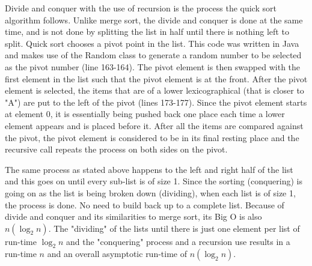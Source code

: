 \documentclass[letterpaper, 10pt,DIV=13]{scrartcl}
\numberwithin{equation}{section} %
\numberwithin{figure}{section} %
\numberwithin{table}{section} %
\begin{document}
Divide and conquer with the use of recursion is the process the quick sort algorithm follows.  Unlike merge sort, the divide and conquer is done at the same time, and is not done by splitting the list in half until there is nothing left to split.  Quick sort chooses a pivot point in the list.  This code was written in Java and makes use of the Random class to generate a random number to be selected as the pivot number (line 163-164).  The pivot element is then swapped with the first element in the list such that the pivot element is at the front.  After the pivot element is selected, the items that are of a lower lexicographical (that is closer to "A") are put to the left of the pivot (lines 173-177).  Since the pivot element starts at element 0, it is essentially being pushed back one place each time a lower element appears and is placed before it.  After all the items are compared against the pivot, the pivot element is considered to be in its final resting place and the recursive call repeats the process on both sides on the pivot.  

The same process as stated above happens to the left and right half of the list and this goes on until every sub-list is of size 1.  Since the sorting (conquering) is going on as the list is being broken down (dividing), when each list is of size 1, the process is done.  No need to build back up to a complete list.  Because of divide and conquer and its similarities to merge sort, its Big O is also $n({\log_2 n})$.  The "dividing" of the lists until there is just one element per list of run-time ${\log_2 n}$ and the "conquering" process and a recursion use results in a run-time $n$ and an overall asymptotic run-time of $n({\log_2 n})$.
\end{document}
